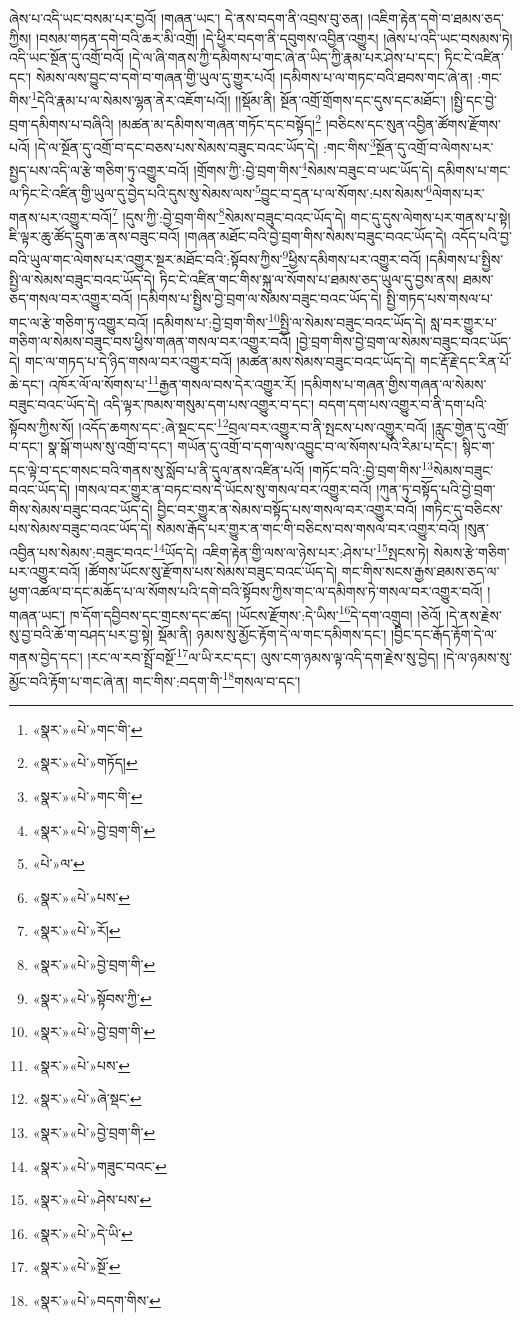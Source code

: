 ཞེས་པ་འདི་ཡང་བསམ་པར་བྱའོ། །གཞན་ཡང་། དེ་ནས་བདག་ནི་འབྲས་བུ་ཅན། །འཇིག་རྟེན་དགེ་བ་ཐམས་ཅད་ཀྱིས། །བསམ་གཏན་དགེ་བའི་ཆར་མི་འགྲོ། །དེ་ཕྱིར་བདག་ནི་དབུགས་འབྱིན་འགྱུར། །ཞེས་པ་འདི་ཡང་བསམས་ཏེ། འདི་ཡང་སྔོན་དུ་འགྲོ་བའོ། །དེ་ལ་ཞི་གནས་ཀྱི་དམིགས་པ་གང་ཞེ་ན་ཡིད་ཀྱི་རྣམ་པར་ཤེས་པ་དང་། ཏིང་ངེ་འཛིན་དང་། སེམས་ལས་བྱུང་བ་དགེ་བ་གཞན་གྱི་ཡུལ་དུ་གྱུར་པའོ། །དམིགས་པ་ལ་གཏང་བའི་ཐབས་གང་ཞེ་ན། :གང་གིས་\footnote{«སྣར་»«པེ་»གང་གི་}དེའི་རྣམ་པ་ལ་སེམས་ལྷན་ནེར་འཇོག་པའོ།། །།སྡོམ་ནི། སྔོན་འགྲོ་གྲོགས་དང་དུས་དང་མཐོང་། །སྤྱི་དང་བྱེ་བྲག་དམིགས་པ་བཞིའི། །མཚན་མ་དམིགས་གཞན་གཏོང་དང་བསྟོད།\footnote{«སྣར་»«པེ་»གཏོད།} །བཅིངས་དང་སུན་འབྱིན་ཚོགས་རྫོགས་པའོ། །དེ་ལ་སྔོན་དུ་འགྲོ་བ་དང་བཅས་པས་སེམས་བཟུང་བའང་ཡོད་དེ། :གང་གིས་\footnote{«སྣར་»«པེ་»གང་གི་}སྔོན་དུ་འགྲོ་བ་ལེགས་པར་སྤྱད་པས་འདི་ལ་རྩེ་གཅིག་ཏུ་འགྱུར་བའོ། །གྲོགས་ཀྱི་:བྱེ་བྲག་གིས་\footnote{«སྣར་»«པེ་»བྱེ་བྲག་གི་}སེམས་བཟུང་བ་ཡང་ཡོད་དེ། དམིགས་པ་གང་ལ་ཏིང་ངེ་འཛིན་གྱི་ཡུལ་དུ་བྱེད་པའི་དུས་སུ་སེམས་ལས་\footnote{«པེ་»ལ་}བྱུང་བ་དྲན་པ་ལ་སོགས་:པས་སེམས་\footnote{«སྣར་»«པེ་»པས་}ལེགས་པར་གནས་པར་འགྱུར་བའོ།\footnote{«སྣར་»«པེ་»རོ།} །དུས་ཀྱི་:བྱེ་བྲག་གིས་\footnote{«སྣར་»«པེ་»བྱེ་བྲག་གི་}སེམས་བཟུང་བའང་ཡོད་དེ། གང་དུ་དུས་ལེགས་པར་གནས་པ་སྟེ། ཇི་ལྟར་ཆུ་ཚོད་དྲུག་ཆ་ནས་བཟུང་བའོ། །གཞན་མཐོང་བའི་བྱེ་བྲག་གིས་སེམས་བཟུང་བའང་ཡོད་དེ། འདོད་པའི་བྱ་བའི་ཡུལ་གང་ལེགས་པར་འགྱུར་སྔར་མཐོང་བའི་:སྟོབས་ཀྱིས་\footnote{«སྣར་»«པེ་»སྟོབས་ཀྱི་}ཕྱིས་དམིགས་པར་འགྱུར་བའོ། །དམིགས་པ་སྤྱིས་སྤྱི་ལ་སེམས་བཟུང་བའང་ཡོད་དེ། ཏིང་ངེ་འཛིན་གང་གིས་སྐུ་ལ་སོགས་པ་ཐམས་ཅད་ཡུལ་དུ་བྱས་ནས། ཐམས་ཅད་གསལ་བར་འགྱུར་བའོ། །དམིགས་པ་སྤྱིས་བྱེ་བྲག་ལ་སེམས་བཟུང་བའང་ཡོད་དེ། སྤྱི་གཏད་པས་གསལ་པ་གང་ལ་རྩེ་གཅིག་ཏུ་འགྱུར་བའོ། །དམིགས་པ་:བྱེ་བྲག་གིས་\footnote{«སྣར་»«པེ་»བྱེ་བྲག་གི་}སྤྱི་ལ་སེམས་བཟུང་བའང་ཡོད་དེ། སླ་བར་གྱུར་པ་གཅིག་ལ་སེམས་བཟུང་བས་ཕྱིས་གཞན་གསལ་བར་འགྱུར་བའོ། །བྱེ་བྲག་གིས་བྱེ་བྲག་ལ་སེམས་བཟུང་བའང་ཡོད་དེ། གང་ལ་གཏད་པ་དེ་ཉིད་གསལ་བར་འགྱུར་བའོ། །མཚན་མས་སེམས་བཟུང་བའང་ཡོད་དེ། གང་རྡོ་རྗེ་དང་རིན་པོ་ཆེ་དང་། འཁོར་ལོ་ལ་སོགས་པ་\footnote{«སྣར་»«པེ་»པས་}རྒྱན་གསལ་བས་དེར་འགྱུར་རོ། །དམིགས་པ་གཞན་གྱིས་གཞན་ལ་སེམས་བཟུང་བའང་ཡོད་དེ། འདི་ལྟར་ཁམས་གསུམ་དག་པས་འགྱུར་བ་དང་། བདག་དག་པས་འགྱུར་བ་ནི་དག་པའི་སྟོབས་ཀྱིས་སོ། །འདོད་ཆགས་དང་:ཞེ་སྡང་དང་\footnote{«སྣར་»«པེ་»ཞེ་སྡང་}བྲལ་བར་འགྱུར་བ་ནི་སྤངས་པས་འགྱུར་བའོ། །རླུང་གྱེན་དུ་འགྲོ་བ་དང་། སྣ་སྒོ་གཡས་སུ་འགྲོ་བ་དང་། གཡོན་དུ་འགྲོ་བ་དག་ལས་འབྱུང་བ་ལ་སོགས་པའི་རིམ་པ་དང་། སྙིང་ག་དང་ལྟེ་བ་དང་གསང་བའི་གནས་སུ་སློབ་པ་ནི་དུལ་ནས་འཛིན་པའོ། །གཏོང་བའི་:བྱེ་བྲག་གིས་\footnote{«སྣར་»«པེ་»བྱེ་བྲག་གི་}སེམས་བཟུང་བའང་ཡོད་དེ། །གསལ་བར་གྱུར་ན་བཏང་བས་དེ་ཡོངས་སུ་གསལ་བར་འགྱུར་བའོ། །ཀུན་ཏུ་བསྟོད་པའི་བྱེ་བྲག་གིས་སེམས་བཟུང་བའང་ཡོད་དེ། བྱིང་བར་གྱུར་ན་སེམས་བསྟོད་པས་གསལ་བར་འགྱུར་བའོ། །གཏིང་དུ་བཅིངས་པས་སེམས་བཟུང་བའང་ཡོད་དེ། སེམས་རྒོད་པར་གྱུར་ན་གང་གི་བཅིངས་བས་གསལ་བར་འགྱུར་བའོ། །སུན་འབྱིན་པས་སེམས་:བཟུང་བའང་\footnote{«སྣར་»«པེ་»གཟུང་བའང་}ཡོད་དེ། འཇིག་རྟེན་གྱི་ལས་ལ་ཉེས་པར་:ཤེས་པ་\footnote{«སྣར་»«པེ་»ཤེས་པས་}སྤངས་ཏེ། སེམས་རྩེ་གཅིག་པར་འགྱུར་བའོ། །ཚོགས་ཡོངས་སུ་རྫོགས་པས་སེམས་བཟུང་བའང་ཡོད་དེ། གང་གིས་སངས་རྒྱས་ཐམས་ཅད་ལ་ཕྱག་འཚལ་བ་དང་མཆོད་པ་ལ་སོགས་པའི་དགེ་བའི་སྟོབས་ཀྱིས་གང་ལ་དམིགས་ཏེ་གསལ་བར་འགྱུར་བའོ། །གཞན་ཡང་། ཁ་དོག་དབྱིབས་དང་གྲངས་དང་ཚད། །ཡོངས་རྫོགས་:དེ་ཡིས་\footnote{«སྣར་»«པེ་»དེ་ཡི་}དེ་དག་འགྲུབ། །ཅེའོ། །དེ་ནས་རྗེས་སུ་བྱ་བའི་ཆོ་ག་བཤད་པར་བྱ་སྟེ། སྡོམ་ནི། ཉམས་སུ་མྱོང་རྟོག་དེ་ལ་གང་དམིགས་དང་། །བྱིང་དང་རྒོད་རྟོག་དེ་ལ་གནས་བྱེད་དང་། །རང་ལ་རབ་སྤྲོ་བསྔོ་\footnote{«སྣར་»«པེ་»སྔོ་}ལ་ཡི་རང་དང་། ལུས་ངག་ཉམས་ལྟ་འདི་དག་རྗེས་སུ་བྱེད། །དེ་ལ་ཉམས་སུ་མྱོང་བའི་རྟོག་པ་གང་ཞེ་ན། གང་གིས་:བདག་གི་\footnote{«སྣར་»«པེ་»བདག་གིས་}གསལ་བ་དང་། 